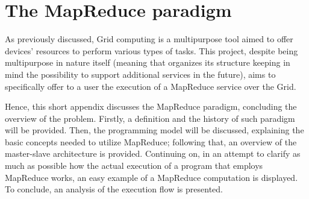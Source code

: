 \chapter{The MapReduce paradigm}\label{the_mapreduce_paradigm}
As previously discussed, Grid computing is a multipurpose tool aimed to offer devices' resources to perform various types of tasks. This project, despite being multipurpose in nature itself (meaning that organizes its structure keeping in mind the possibility to support additional services in the future), aims to specifically offer to a user the execution of a MapReduce service over the Grid.

Hence, this short appendix discusses the MapReduce paradigm, concluding the overview of the problem. Firstly, a definition and the history of such paradigm will be provided. Then, the programming model will be discussed, explaining the basic concepts needed to utilize MapReduce; following that, an overview of the master-slave architecture is provided. Continuing on, in an attempt to clarify as much as possible how the actual execution of a program that employs MapReduce works, an easy example of a MapReduce computation is displayed. To conclude, an analysis of the execution flow is presented.





